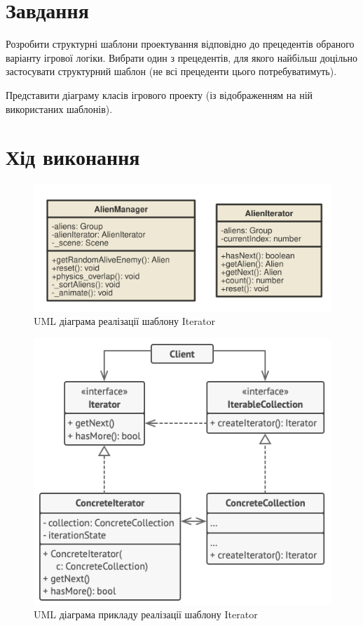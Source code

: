 \documentclass[oneside,14pt]{extarticle}
\begin{document}
\begin{normalsize}
	\section*{Завдання}
Розробити структурні шаблони проектування відповідно до прецедентів обраного
варіанту ігрової логіки. Вибрати один з прецедентів, для якого найбільш доцільно
застосувати структурний шаблон (не всі прецеденти цього потребуватимуть).

	Представити діаграму класів ігрового проекту (із відображенням на ній використаних
	шаблонів).

	\section*{Хід виконання}
	
	\begin{figure}[H]
		\centering
		\includegraphics[]{iterator}
		\caption{UML діаграма реалізації шаблону Iterator}
	\end{figure}
	
	\begin{figure}[H]
		\centering
		\includegraphics[]{iterator-ex}
		\caption{UML діаграма прикладу реалізації шаблону Iterator}
	\end{figure}
	

\end{normalsize}
\end{document}
